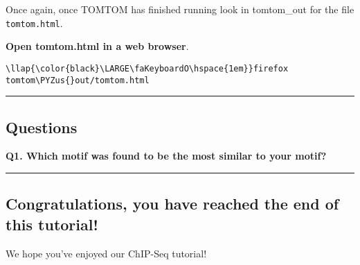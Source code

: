 \documentclass[11pt]{article}
\def\PYZus{\char`\_}
\begin{document}
    Once again, once TOMTOM has finished running look in tomtom\_out for the
file \texttt{tomtom.html}.

\textbf{Open tomtom.html in a web browser}.





\begin{terminalinput}
\begin{Verbatim}[commandchars=\\\{\}]
\llap{\color{black}\LARGE\faKeyboardO\hspace{1em}}firefox tomtom\PYZus{}out/tomtom.html
\end{Verbatim}
\end{terminalinput}



    \begin{center}\rule{0.5\linewidth}{.4pt}\end{center}

    \hypertarget{questions}{%
\subsection{Questions}\label{questions}}

\textbf{Q1. Which motif was found to be the most similar to your motif?}

    \begin{center}\rule{0.5\linewidth}{.4pt}\end{center}

    \hypertarget{congratulations-you-have-reached-the-end-of-this-tutorial}{%
\subsection{Congratulations, you have reached the end of this
tutorial!}\label{congratulations-you-have-reached-the-end-of-this-tutorial}}

We hope you've enjoyed our ChIP-Seq tutorial!


\end{document}

